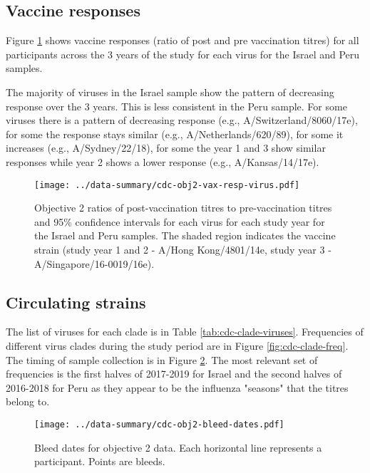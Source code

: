 \documentclass[12pt]{article}
\begin{document}
\subsection{Vaccine responses}

Figure \ref{fig:cdc-obj2-vax-resp-virus} shows vaccine responses (ratio of post and pre vaccination titres)
for all participants across the 3 years of the study for each virus for the Israel and Peru samples.

The majority of viruses in the Israel sample show the pattern of decreasing response over the 3 years. This is less consistent in the Peru sample. For some viruses
there is a pattern of decreasing response (e.g., A/Switzerland/8060/17e), for some the response stays similar (e.g., A/Netherlands/620/89), for some it increases
(e.g., A/Sydney/22/18), for some the year 1 and 3 show similar responses while
year 2 shows a lower response (e.g., A/Kansas/14/17e).

\begin{figure}
	\texttt{[image: ../data-summary/cdc-obj2-vax-resp-virus.pdf]}
	\caption{Objective 2 ratios of post-vaccination titres to pre-vaccination titres and 95\% confidence intervals for each virus for each study year for the Israel and Peru samples. The shaded region indicates the vaccine strain (study year 1 and 2 - A/Hong Kong/4801/14e, study year 3 - A/Singapore/16-0019/16e).}
	\label{fig:cdc-obj2-vax-resp-virus}
\end{figure}

\subsection{Circulating strains}

The list of viruses for each clade is in Table \ref{tab:cdc-clade-viruses}. Frequencies of different virus clades during the study period are in Figure \ref{fig:cdc-clade-freq}. The timing of sample collection is in Figure \ref{fig:cdc-obj2-bleed-dates}. The most relevant set of frequencies is the first halves of 2017-2019 for Israel and the second halves of 2016-2018 for Peru as they appear to be the influenza "seasons" that the titres belong to.

\begin{figure}
	\texttt{[image: ../data-summary/cdc-obj2-bleed-dates.pdf]}
	\caption{Bleed dates for objective 2 data. Each horizontal line represents a participant. Points are bleeds.}
	\label{fig:cdc-obj2-bleed-dates}
\end{figure}
\end{document}
